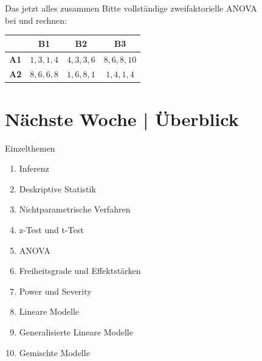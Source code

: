 \begin{frame}
  {Das jetzt alles zusammen}
  Bitte vollständige zweifaktorielle ANOVA\\
  bei  und  rechnen:\\

  \begin{center}
    \begin{tabular}[h!]{|c||c|c|c|}
      \hline
      & \textbf{B1} & \textbf{B2} & \textbf{B3} \\
      \hline
      \hline
      \textbf{A1} & $1, 3, 1, 4$ & $4, 3, 3, 6$ & $8, 6, 8, 10$ \\
      \hline
      \textbf{A2} & $8, 6, 6, 8$ & $1, 6, 8, 1$ & $1, 4, 1, 4$ \\
      \hline
    \end{tabular}
  \end{center}
\end{frame}


\ifdefined\TITLE
  \section{Nächste Woche | Überblick}

  \begin{frame}
    {Einzelthemen}
    \begin{enumerate}
      \item Inferenz
      \item Deskriptive Statistik
      \item Nichtparametrische Verfahren
      \item z-Test und t-Test
      \item ANOVA
      \item \alert{Freiheitsgrade und Effektstärken}
      \item Power und Severity
      \item Lineare Modelle
      \item Generalisierte Lineare Modelle
      \item Gemischte Modelle
    \end{enumerate}
  \end{frame}
\fi

